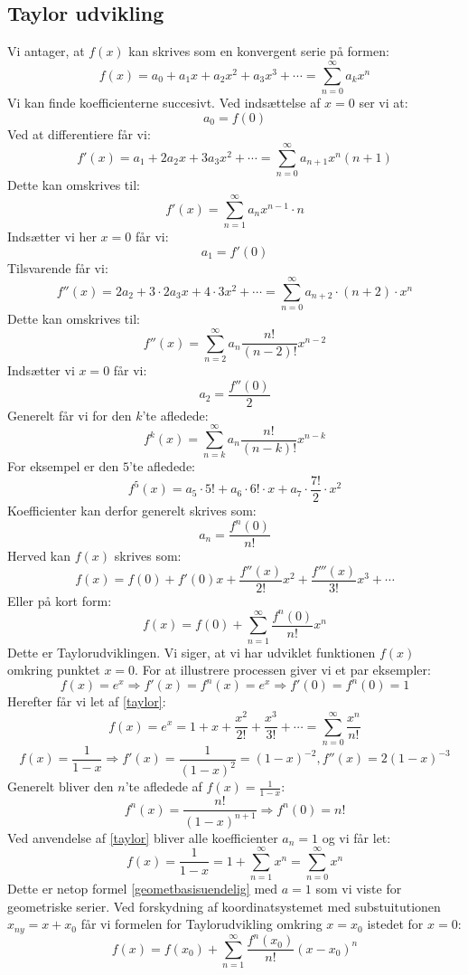 \subsection{Taylor udvikling}
Vi antager, at \(f(x)\) kan skrives som en konvergent serie på formen:
\[f(x)=a_{0}+a_{1}x+a_{2}x^{2}+a_{3}x^{3}+\dotsm=\sum_{n=0}^{\infty}a_{k}x^{n}\]
Vi kan finde koefficienterne succesivt. Ved indsættelse af \(x=0\) ser vi at:
\[a_{0}=f(0)\]
Ved at differentiere får vi:
\[f'(x)=a_{1}+2a_{2}x+3a_{3}x^{2}+\dotsm=\sum_{n=0}^{\infty}a_{n+1}x^{n}(n+1)\]
Dette kan omskrives til:
\[f'(x)=\sum_{n=1}^{\infty}a_{n}x^{n-1} \cdot n\]
Indsætter vi her \(x=0\) får vi:
\[a_{1}=f'(0)\]
Tilsvarende får vi:
\[f''(x)=2a_{2}+3 \cdot 2a_{3}x+4 \cdot 3x^{2}+ \dotsm=\sum_{n=0}^{\infty}a_{n+2} \cdot (n+2) \cdot x^{n}\]
Dette kan omskrives til:
\[f''(x)=\sum_{n=2}^{\infty}a_{n}\frac{n!}{(n-2)!}x^{n-2}\]
Indsætter vi \(x=0\) får vi:
\[a_{2}=\frac{f''(0)}{2}\]
Generelt får vi for den \(k\)'te afledede:
\[f^{k}(x)=\sum_{n=k}^{\infty}a_{n}\frac{n!}{(n-k)!}x^{n-k}\]
For eksempel er den \(5\)'te afledede:
\[f^{5}(x)=a_{5} \cdot 5!+a_{6} \cdot 6! \cdot x+a_{7} \cdot \frac{7!}{2} \cdot x^{2}\]
Koefficienter kan derfor generelt skrives som:
\[a_{n}=\frac{f^{n}(0)}{n!}\]
Herved kan \(f(x)\) skrives som:
\[f(x)=f(0)+f'(0)x+\frac{f''(x)}{2!}x^{2}+\frac{f'''(x)}{3!}x^{3}+ \dotsm\]
Eller på kort form:
\begin{equation}
f(x)=f(0)+\sum_{n=1}^{\infty}\frac{f^{n}(0)}{n!}x^{n}\label{taylor}
\end{equation}
Dette er Taylorudviklingen. Vi siger, at vi har udviklet funktionen \(f(x)\) omkring punktet \(x=0\).
For at illustrere processen giver vi et par eksempler:
\[f(x)=e^{x} \Rightarrow f'(x)=f^{n}(x)=e^{x} \Rightarrow f'(0)=f^{n}(0)=1\]
Herefter får vi let af \ref{taylor}:
\[f(x)=e^{x}=1+x+\frac{x^{2}}{2!}+\frac{x^{3}}{3!}+\dotsm=\sum_{n=0}^{\infty}\frac{x^n}{n!}\]
\[f(x)=\frac{1}{1-x} \Rightarrow f'(x)=\frac{1}{(1-x)^{2}}=(1-x)^{-2}, f''(x)=2(1-x)^{-3}\]
Generelt bliver den \(n\)'te afledede af \(f(x)=\frac{1}{1-x}\):
\[f^{n}(x)=\frac{n!}{(1-x)^{n+1}} \Rightarrow f^{n}(0)=n!\]
Ved anvendelse af \ref{taylor} bliver alle koefficienter \(a_{n}=1\) og vi får let:
\[f(x)=\frac{1}{1-x}=1+\sum_{n=1}^{\infty}x^{n}=\sum_{n=0}^{\infty}x^{n}\]
Dette er netop formel \ref{geometbasisuendelig} med \(a=1\) som vi viste for geometriske serier.
Ved forskydning af koordinatsystemet med substuitutionen \(x_{ny}=x+x_{0}\) får vi formelen for Taylorudvikling omkring \(x=x_{0}\) istedet for \(x=0\):
\begin{equation}
f(x)=f(x_{0})+\sum_{n=1}^{\infty}\frac{f^{n}(x_{0})}{n!}(x-x_{0})^{n}\label{taylorx0}
\end{equation}
